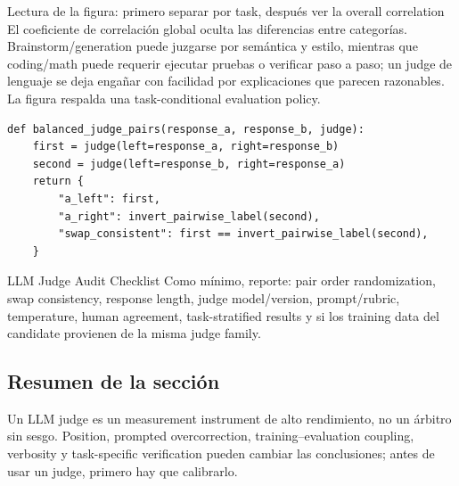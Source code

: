 \begin{knowledgebox}{Lectura de la figura: primero separar por task, después ver la overall correlation}
El coeficiente de correlación global oculta las diferencias entre categorías. Brainstorm/generation puede juzgarse por semántica y estilo, mientras que coding/math puede requerir ejecutar pruebas o verificar paso a paso; un judge de lenguaje se deja engañar con facilidad por explicaciones que parecen razonables. La figura respalda una task-conditional evaluation policy.
\end{knowledgebox}


\begin{lstlisting}[caption={Implementación conceptual de la Counterbalanced pairwise LLM-judge evaluation}]
def balanced_judge_pairs(response_a, response_b, judge):
    first = judge(left=response_a, right=response_b)
    second = judge(left=response_b, right=response_a)
    return {
        "a_left": first,
        "a_right": invert_pairwise_label(second),
        "swap_consistent": first == invert_pairwise_label(second),
    }
\end{lstlisting}

\begin{importantbox}{LLM Judge Audit Checklist}
Como mínimo, reporte: pair order randomization, swap consistency, response length, judge model/version, prompt/rubric, temperature, human agreement, task-stratified results y si los training data del candidate provienen de la misma judge family.
\end{importantbox}

\subsection{Resumen de la sección}

Un LLM judge es un measurement instrument de alto rendimiento, no un árbitro sin sesgo. Position, prompted overcorrection, training--evaluation coupling, verbosity y task-specific verification pueden cambiar las conclusiones; antes de usar un judge, primero hay que calibrarlo.
